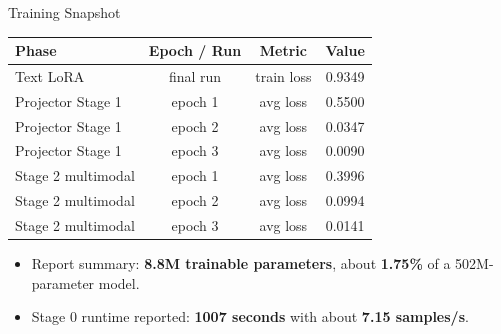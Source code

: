 \documentclass[aspectratio=169,11pt]{beamer}
\begin{document}
\begin{frame}{Training Snapshot}
\small
\begin{center}
\begin{tabularx}{\linewidth}{lccc}
\toprule
\textbf{Phase} & \textbf{Epoch / Run} & \textbf{Metric} & \textbf{Value} \\
\midrule
Text LoRA & final run & train loss & 0.9349 \\
Projector Stage 1 & epoch 1 & avg loss & 0.5500 \\
Projector Stage 1 & epoch 2 & avg loss & 0.0347 \\
Projector Stage 1 & epoch 3 & avg loss & 0.0090 \\
Stage 2 multimodal & epoch 1 & avg loss & 0.3996 \\
Stage 2 multimodal & epoch 2 & avg loss & 0.0994 \\
Stage 2 multimodal & epoch 3 & avg loss & 0.0141 \\
\bottomrule
\end{tabularx}
\end{center}
\vspace{0.4em}
\begin{itemize}
    \item Report summary: \textbf{8.8M trainable parameters}, about \textbf{1.75\%} of a 502M-parameter model.
    \item Stage 0 runtime reported: \textbf{1007 seconds} with about \textbf{7.15 samples/s}.
\end{itemize}
\end{frame}
\end{document}
